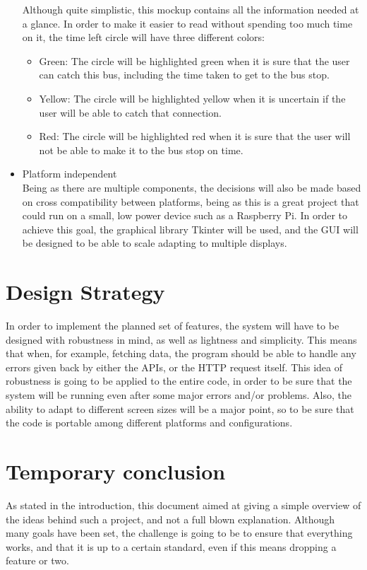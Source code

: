 \documentclass[a4paper]{article}
\begin{document}
\begin{itemize}
\begin{center}
\end{center}
Although quite simplistic, this mockup contains all the information needed at a glance. In order to make it easier to read without spending too much time on it, the time left circle will have three different colors:
\begin{itemize}
\item Green: The circle will be highlighted green when it is sure that the user can catch this bus, including the time taken to get to the bus stop.
\item Yellow: The circle will be highlighted yellow when it is uncertain if the user will be able to catch that connection.
\item Red: The circle will be highlighted red when it is sure that the user will not be able to make it to the bus stop on time. 
\end{itemize}
\item Platform independent\\
Being as there are multiple components, the decisions will also be made based on cross compatibility between platforms, being as this is a great project that could run on a small, low power device such as a Raspberry Pi. In order to achieve this goal, the graphical library Tkinter will be used, and the GUI will be designed to be able to scale adapting to multiple displays.
\end{itemize}

\section{Design Strategy}
In order to implement the planned set of features, the system will have to be designed with robustness in mind, as well as lightness and simplicity. This means that when, for example, fetching data, the program should be able to handle any errors given back by either the APIs, or the HTTP request itself. This idea of robustness is going to be applied to the entire code, in order to be sure that the system will be running even after some major errors and/or problems. Also, the ability to adapt to different screen sizes will be a major point, so to be sure that the code is portable among different platforms and configurations.

\section{Temporary conclusion}
As stated in the introduction, this document aimed at giving a simple overview of the ideas behind such a project, and not a full blown explanation. Although many goals have been set, the challenge is going to be to ensure that everything works, and that it is up to a certain standard, even if this means dropping a feature or two. 
\end{document}
